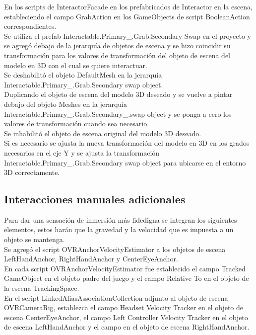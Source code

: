 En los scripts de InteractorFacade en los prefabricados de Interactor en la escena, estableciendo el campo GrabAction en los GameObjects de script BooleanAction correspondientes.\\

Se utiliza el prefab Interactable.Primary\_.Grab.Secondary Swap en el proyecto y se agregó debajo de la jerarquía de objetos de escena y se hizo coincidir su transformación para los valores de transformación del objeto de escena del modelo en 3D con el cual se quiere interactuar.\\

Se deshabilitó el objeto DefaultMesh en la jerarquía Interactable.Primary\_.Grab.Secondary swap object.\\

Duplicando el objeto de escena del modelo 3D deseado y  se vuelve a pintar debajo del objeto Meshes en la jerarquía Interactable.Primary\_.Grab.Secondary\_.swap object y se ponga a cero los valores de transformación cuando sea necesario.\\

Se inhabilitó el objeto de escena original del modelo 3D deseado.\\

Si es necesario se ajusta la nueva transformación del modelo en 3D en los grados necesarios en el eje Y y se ajusta la transformación Interactable.Primary\_.Grab.Secondary swap object para ubicarse en el entorno 3D correctamente.\\

\subsection{Interacciones manuales adicionales}

Para dar una sensación de inmersión más fidedigna se integran los siguientes elementos, estos harán que la gravedad y la velocidad que es impuesta a un objeto se mantenga.\\

Se agregó el script OVRAnchorVelocityEstimator a los objetos de escena LeftHandAnchor, RightHandAnchor y CenterEyeAnchor.\\

En cada script OVRAnchorVelocityEstimator fue establecido el campo Tracked GameObject en el objeto padre del juego y el campo Relative To en el objeto de la escena TrackingSpace.\\

En el script LinkedAliasAssociationCollection adjunto al objeto de escena OVRCameraRig, establezca el campo Headset Velocity Tracker en el objeto de escena CenterEyeAnchor, el campo Left Controller Velocity Tracker en el objeto de escena LeftHandAnchor y el campo en el objeto de escena RightHandAnchor.\\

